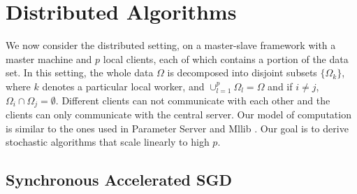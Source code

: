 \documentclass[conference]{IEEEtran}
\theoremstyle{definition}
\theoremstyle{remark}
\begin{document}
\section{Distributed Algorithms}

We now consider the distributed setting, on a master-slave framework with a master machine and $p$ local clients, each of which contains a portion of
the data set. In this setting, the whole data $\Omega$ is decomposed into disjoint
subsets $\{\Omega_k\}$,  where $k$ denotes  a  particular  local  worker,
and $\cup_{l=1}^p{\Omega_l} = \Omega$ and if $i\neq j$, $\Omega_i\cap\Omega_j = \emptyset$. Different clients can not communicate with each other and the  clients  can
only communicate with the central server. Our model of
computation is similar to the ones used in Parameter
Server \cite{Li2014} and Mllib \cite{Meng2016Spark}. Our goal is to
derive stochastic algorithms that scale linearly to high $p$.

\subsection{Synchronous Accelerated SGD}
\end{document}
